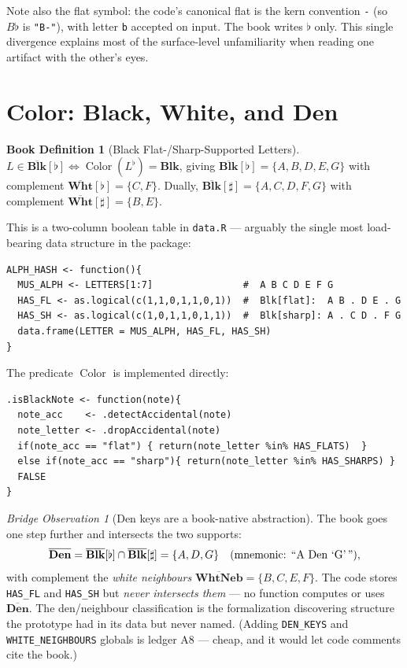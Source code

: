\documentclass[11pt]{article}
\newcommand{\BL}{\overline{\textbf{Blk}}}       %
\newcommand{\WH}{\overline{\textbf{Wht}}}       %
\newcommand{\DN}{\overline{\textbf{Den}}}       %
\newcommand{\WN}{\overline{\textbf{WhtNeb}}}    %
\newcommand{\Colorf}{\operatorname{Color}}
\newcommand{\kernflat}{\texttt{-}}              %
\theoremstyle{definition}
\newtheorem{bookdef}{Book Definition}[section]
\theoremstyle{remark}
\newtheorem{bridge}{Bridge Observation}[section]
\newcommand{\code}[1]{\texttt{#1}}
\newcommand{\file}[1]{\texttt{#1}}
\begin{document}
Note also the flat symbol: the code's canonical flat is the kern convention
\kernflat{} (so $B\flat$ is \code{"B-"}), with letter \code{b} accepted on input.
The book writes $\flat$ only. This single divergence explains most of the
surface-level unfamiliarity when reading one artifact with the other's eyes.

\section{Color: Black, White, and Den}\label{sec:color}

\begin{bookdef}[Black Flat-/Sharp-Supported Letters]
$L \in \BL[\flat] \iff \Colorf(L^{\flat}) = \mathbf{Blk}$, giving
$\BL[\flat] = \{A, B, D, E, G\}$ with complement $\WH[\flat] = \{C, F\}$.
Dually, $\BL[\sharp] = \{A, C, D, F, G\}$ with complement
$\WH[\sharp] = \{B, E\}$.
\end{bookdef}

This is a two-column boolean table in \file{data.R} --- arguably the single most
load-bearing data structure in the package:

\begin{lstlisting}
ALPH_HASH <- function(){
  MUS_ALPH <- LETTERS[1:7]                #  A B C D E F G
  HAS_FL <- as.logical(c(1,1,0,1,1,0,1))  #  Blk[flat]:  A B . D E . G
  HAS_SH <- as.logical(c(1,0,1,1,0,1,1))  #  Blk[sharp]: A . C D . F G
  data.frame(LETTER = MUS_ALPH, HAS_FL, HAS_SH)
}
\end{lstlisting}

The predicate $\Colorf$ is implemented directly:

\begin{lstlisting}
.isBlackNote <- function(note){
  note_acc    <- .detectAccidental(note)
  note_letter <- .dropAccidental(note)
  if(note_acc == "flat") { return(note_letter %in% HAS_FLATS)  }
  else if(note_acc == "sharp"){ return(note_letter %in% HAS_SHARPS) }
  FALSE
}
\end{lstlisting}

\begin{bridge}[Den keys are a book-native abstraction]
The book goes one step further and intersects the two supports:
$$\DN = \BL[\flat] \cap \BL[\sharp] = \{A, D, G\}
\quad (\text{mnemonic: ``A Den `G'\,''}),$$
with complement the \emph{white neighbours} $\WN = \{B, C, E, F\}$. The code
stores \code{HAS\_FL} and \code{HAS\_SH} but \emph{never intersects them} ---
no function computes or uses $\DN$. The den/neighbour classification is the
formalization discovering structure the prototype had in its data but never
named. (Adding \code{DEN\_KEYS} and \code{WHITE\_NEIGHBOURS} globals is ledger
A8 --- cheap, and it would let code comments cite the book.)
\end{bridge}
\end{document}
